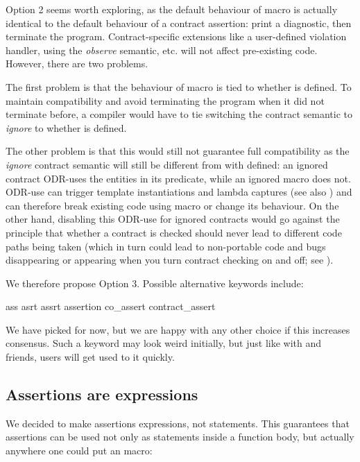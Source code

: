 Option 2 seems worth exploring, as the default behaviour of macro  is actually identical to the default behaviour of a contract assertion: print a diagnostic, then terminate the program. Contract-specific extensions like a user-defined violation handler, using the \emph{observe} semantic, etc. will not affect pre-existing code. However, there are two problems.

The first problem is that the behaviour of macro  is tied to whether  is defined. To maintain compatibility and avoid terminating the program when it did not terminate before, a compiler would have to tie switching the contract semantic to \emph{ignore} to whether  is defined.

The other problem is that this would still not guarantee full compatibility as the \emph{ignore} contract semantic will still be different from  with  defined: an ignored contract ODR-uses the entities in its predicate, while an ignored  macro does not. ODR-use can trigger template instantiations and lambda captures (see also \cite{P2890R0}) and can therefore break existing code using macro  or change its behaviour. On the other hand, disabling this ODR-use for ignored contracts would go against the principle that whether a contract is checked should never lead to different code paths being taken (which in turn could lead to non-portable code and bugs disappearing or appearing when you turn contract checking on and off; see \cite{P2834R1}).

We therefore propose Option 3. Possible alternative keywords include:

\begin{codeblock}
ass                         
asrt                        
assrt                       
assertion                   
co_assert
contract_assert
\end{codeblock}

We have picked  for now, but we are happy with any other choice if this increases consensus. Such a keyword may look weird initially, but just like with  and friends, users will get used to it quickly.

\subsection{Assertions are expressions}

We decided to make assertions expressions, not statements. This guarantees that assertions can be used not only as statements inside a function body, but actually anywhere one could put an  macro:

